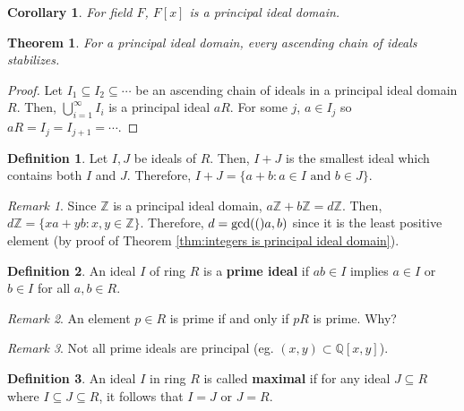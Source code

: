 \documentclass[
    parskip=half,
    toc=flat,
    toc=sectionentrydotfill,
]{scrartcl}  %
\theoremstyle{definition}
\newtheorem{definition}{Definition}[section]
\theoremstyle{plain}
\newtheorem{theorem}{Theorem}[definition]
\newtheorem{corollary}{Corollary}[definition]
\theoremstyle{remark}
\newtheorem{remark}{Remark}[definition]
\renewcommand{\gcd}[1]{\textup{gcd}(#1)}
\begin{document}
\begin{corollary}
    For field $F$, $F[x]$ is a principal ideal domain.
\end{corollary}

\begin{theorem}
    For a principal ideal domain, every ascending chain of ideals stabilizes.
\end{theorem}

\begin{proof}
    Let $I_1\subseteq I_2\subseteq\cdots$ be an ascending chain of ideals in a
    principal ideal domain $R$.
    Then, $\bigcup_{i=1}^\infty I_i$ is a principal ideal $aR$.
    For some $j$, $a\in I_j$ so $aR=I_j=I_{j+1}=\cdots$.
\end{proof}

\begin{definition}
    Let $I,J$ be ideals of $R$. Then, $I+J$ is the smallest ideal which contains
    both $I$ and $J$.
    Therefore, $I+J=\{a+b:a\in I\text{ and }b\in J\}$.
\end{definition}

\begin{remark}
    Since $\mathbb{Z}$ is a principal ideal domain, $a\mathbb{Z}+b\mathbb{Z}=d\mathbb{Z}$.
    Then, $d\mathbb{Z}=\{xa+yb:x,y\in\mathbb{Z}\}$.
    Therefore, $d=\gcd(a,b)$ since it is the least positive element (by proof
    of Theorem \ref{thm:integers is principal ideal domain}).
\end{remark}

\begin{definition}
    An ideal $I$ of ring $R$ is a \textbf{prime ideal} if $ab\in I$ implies
    $a\in I$ or $b\in I$ for all $a,b\in R$.
\end{definition}

\begin{remark}
    An element $p\in R$ is prime if and only if $pR$ is prime.
    Why?
\end{remark}

\begin{remark}
    Not all prime ideals are principal (eg. $(x,y)\subset\mathbb{Q}[x,y]$).
\end{remark}

\begin{definition}
    An ideal $I$ in ring $R$ is called \textbf{maximal} if for any ideal
    $J\subseteq R$ where $I\subseteq J\subseteq R$, it follows that $I=J$ or
    $J=R$.
\end{definition}
\end{document}
